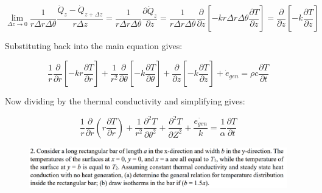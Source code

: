 \documentclass[conf]{new-aiaa}
\begin{document}
\begin{equation*}
    \lim_{\Delta z \rightarrow 0}
    \frac{1}{ r \Delta r \Delta \theta} \frac{\dot{Q}_{z}-\dot{Q}_{z+\Delta z}}{r \Delta z}
    = \frac{1}{ r \Delta r \Delta \theta} \frac{\partial \dot{Q}_{z}}{\partial z}
    = \frac{1}{ r \Delta r \Delta \theta} \frac{\partial}{\partial z}\left[-k r \Delta r \Delta \theta \frac{\partial T}{\partial z}\right]
    = \frac{\partial }{\partial z} \left[ -k \frac{\partial T}{\partial z}\right]
\end{equation*}

\noindent Substituting back into the main equation gives:

\begin{equation*}
    \frac{1}{r} \frac{\partial}{\partial r} \left[-k r \frac{\partial T}{\partial r}\right]
    + \frac{1}{r^2} \frac{\partial}{\partial \theta}\left[-k \frac{\partial T}{ \partial \theta}\right]
    + \frac{\partial }{\partial z} \left[ -k \frac{\partial T}{\partial z}\right]
    + \dot{e}_{gen} 
    = \rho c \frac{\partial T}{\partial t}
\end{equation*}

\noindent Now dividing by the thermal conductivity and simplifying gives:

\begin{equation*}
    \boxed{\frac{1}{r} \frac{\partial}{\partial r} \left(r \frac{\partial T}{\partial r}\right) + \frac{1}{r^{2}} \frac{\partial^2 T}{\partial \theta^2}+\frac{\partial^2 T}{\partial Z^2}+ \frac{\dot{e_{gen}}}{k} = \frac{1}{\alpha} \frac{\partial T}{\partial t}}
\end{equation*}

%
%
%
%
\pagebreak 
\begin{figure}[hbt!]
    \centering
    \includegraphics[width=1\textwidth]{problems/p2.png}
    \label{fig:p2}
\end{figure}
\end{document}
